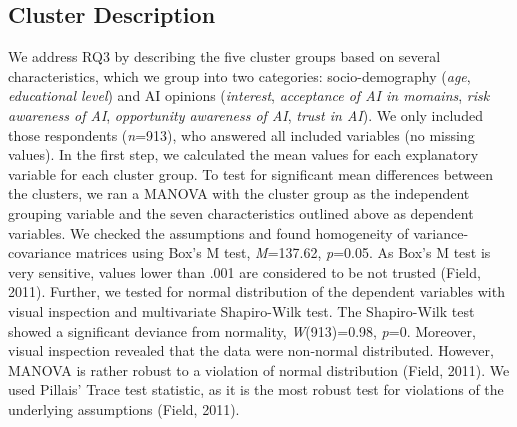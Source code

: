 \documentclass{article}
\begin{document}
\begin{table}

\caption{\label{tab:unnamed-chunk-5}Mean Card Ratings per Group}
\centering
{}
\end{table}

\hypertarget{cluster-description}{%
\subsection{Cluster Description}\label{cluster-description}}

We address RQ3 by describing the five cluster groups based on several
characteristics, which we group into two categories: socio-demography
(\emph{age}, \emph{educational level}) and AI opinions (\emph{interest},
\emph{acceptance of AI in momains}, \emph{risk awareness of AI},
\emph{opportunity awareness of AI}, \emph{trust in AI}). We only
included those respondents (\emph{n}=913), who answered all included
variables (no missing values). In the first step, we calculated the mean
values for each explanatory variable for each cluster group. To test for
significant mean differences between the clusters, we ran a MANOVA with
the cluster group as the independent grouping variable and the seven
characteristics outlined above as dependent variables. We checked the
assumptions and found homogeneity of variance-covariance matrices using
Box's M test, \emph{M}=137.62, \emph{p}=0.05. As Box's M test is very
sensitive, values lower than .001 are considered to be not trusted
(Field, 2011). Further, we tested for normal distribution of the
dependent variables with visual inspection and multivariate Shapiro-Wilk
test. The Shapiro-Wilk test showed a significant deviance from
normality, \emph{W}(913)=0.98, \emph{p}=0. Moreover, visual inspection
revealed that the data were non-normal distributed. However, MANOVA is
rather robust to a violation of normal distribution (Field, 2011). We
used Pillais' Trace test statistic, as it is the most robust test for
violations of the underlying assumptions (Field, 2011).
\end{document}
